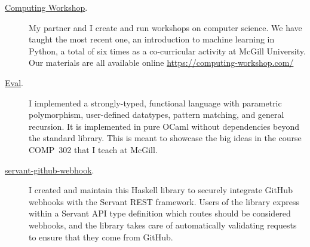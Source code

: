 \documentclass{article}
\begin{document}
\begin{description}
  \item[\href{https://computing-workshop.com/}{Computing Workshop}.]
    My partner and I create and run workshops on computer science. We have taught the most recent
    one, an introduction to machine learning in Python, a total of six times as a co-curricular
    activity at McGill University. Our materials are all available online
    \url{https://computing-workshop.com/}

  \item[\href{https://github.com/tsani/eval}{Eval}.]
    I implemented a strongly-typed, functional language with parametric polymorphism, user-defined
    datatypes, pattern matching, and general recursion. It is implemented in pure OCaml without
    dependencies beyond the standard library. This is meant to showcase the big ideas in the course
    COMP~302 that I teach at McGill.

  \item[\href{https://github.com/tsani/servant-github-webhook}{servant-github-webhook}.]
    I created and maintain this Haskell library to securely integrate GitHub webhooks with the
    Servant REST framework. Users of the library express within a Servant API type definition which
    routes should be considered webhooks, and the library takes care of automatically validating
    requests to ensure that they come from GitHub.

\end{description}
\end{document}
